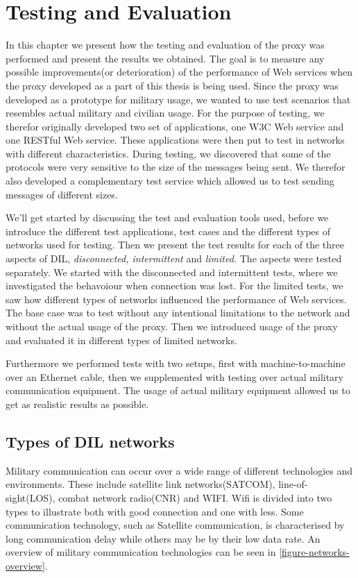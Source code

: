 \chapter{Testing and Evaluation}

In this chapter we present how the testing and evaluation of the proxy was
performed and present the results we obtained.  The goal is to measure any
possible improvements(or deterioration) of the performance of Web services when
the proxy developed as a part of this thesis is being used. Since the proxy was
developed as a prototype for military usage, we wanted to use test scenarios
that resembles actual military and civilian usage. For the purpose of testing,
we therefor originally developed two set of applications, one W3C Web service
and one RESTful Web service. These applications were then put to test in
networks with different characteristics. During testing, we discovered that some
of the protocols were very sensitive to the size of the messages being sent. We
therefor also developed a complementary test service which allowed us to test
sending messages of different sizes.

We'll get started by discussing the test and evaluation tools used, before we
introduce the different test applications, test cases and the different types
of networks used for testing. Then we present the test results for each of the
three aspects of DIL, \textit{disconnected, intermittent} and
\textit{limited.} The aspects were tested separately. We started with the
disconnected and intermittent tests, where we investigated the behavoiour when
connection was lost. For the limited tests, we saw how different types of
networks influenced the performance of Web services. The base case was to
test without any intentional limitations to the network and without the actual
usage of the proxy. Then we introduced usage of the proxy and evaluated it in
different types of limited networks.

Furthermore we performed tests with two setups, first with machine-to-machine
over an Ethernet cable, then we supplemented with testing over actual military
communication equipment. The usage of actual military equipment allowed us to
get as realistic results as possible.

\section{Types of DIL networks}

Military communication can occur over a wide range of different technologies and
environments. These include satellite link networks(SATCOM), line-of-sight(LOS),
combat network radio(CNR) and WIFI. Wifi is divided into two types to illustrate
both with good connection and one with less. Some communication technology, such
as Satellite communication, is characterised by long communication delay while
others may be by their low data rate. An overview of military communication
technologies can be seen in \cref{figure-networks-overview}.

